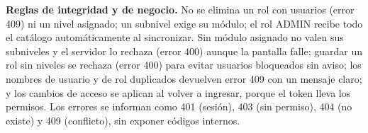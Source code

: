 \documentclass[12pt,a4paper]{report}
\begin{document}
\noindent\textbf{Reglas de integridad y de negocio.} No se elimina un rol con usuarios (error 409) ni un nivel asignado; un subnivel exige su módulo; el rol ADMIN recibe todo el catálogo automáticamente al sincronizar. Sin módulo asignado no valen sus subniveles y el servidor lo rechaza (error 400) aunque la pantalla falle; guardar un rol sin niveles se rechaza (error 400) para evitar usuarios bloqueados sin aviso; los nombres de usuario y de rol duplicados devuelven error 409 con un mensaje claro; y los cambios de acceso se aplican al volver a ingresar, porque el token lleva los permisos. Los errores se informan como 401 (sesión), 403 (sin permiso), 404 (no existe) y 409 (conflicto), sin exponer códigos internos.
\end{document}
